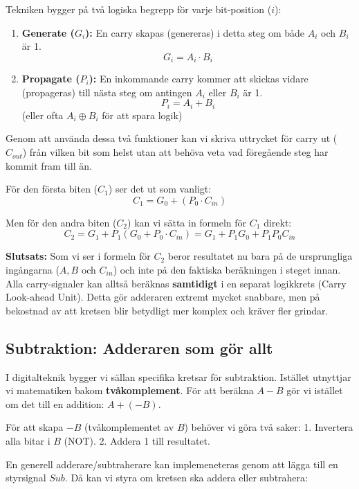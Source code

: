 \documentclass[
  swedish,
  letterpaper,
  oneside,
  openany]{book}
\providecommand{\tightlist}{%
  \setlength{\itemsep}{0pt}\setlength{\parskip}{0pt}}
\begin{document}
Tekniken bygger på två logiska begrepp för varje bit-position (\(i\)):

\begin{enumerate}
\def\labelenumi{\arabic{enumi}.}
\tightlist
\item
  \textbf{Generate (\(G_i\)):} En carry skapas (genereras) i detta steg
  om både \(A_i\) och \(B_i\) är 1. \[G_i = A_i \cdot B_i\]
\item
  \textbf{Propagate (\(P_i\)):} En inkommande carry kommer att skickas
  vidare (propageras) till nästa steg om antingen \(A_i\) eller \(B_i\)
  är 1. \[P_i = A_i + B_i\] (eller ofta \(A_i \oplus B_i\) för att spara
  logik)
\end{enumerate}

Genom att använda dessa två funktioner kan vi skriva uttrycket för carry
ut (\(C_{out}\)) från vilken bit som helst utan att behöva veta vad
föregående steg har kommit fram till än.

För den första biten (\(C_1\)) ser det ut som vanligt:
\[C_1 = G_0 + (P_0 \cdot C_{in})\]

Men för den andra biten (\(C_2\)) kan vi sätta in formeln för \(C_1\)
direkt:
\[C_2 = G_1 + P_1(G_0 + P_0 \cdot C_{in}) = G_1 + P_1 G_0 + P_1 P_0 C_{in}\]

\textbf{Slutsats:} Som vi ser i formeln för \(C_2\) beror resultatet nu
bara på de ursprungliga ingångarna (\(A, B\) och \(C_{in}\)) och inte på
den faktiska beräkningen i steget innan. Alla carry-signaler kan alltså
beräknas \textbf{samtidigt} i en separat logikkrets (Carry Look-ahead
Unit). Detta gör adderaren extremt mycket snabbare, men på bekostnad av
att kretsen blir betydligt mer komplex och kräver fler grindar.

\subsection{Subtraktion: Adderaren som gör
allt}\label{sec-subtraheraren}

I digitalteknik bygger vi sällan specifika kretsar för subtraktion.
Istället utnyttjar vi matematiken bakom \textbf{tvåkomplement}. För att
beräkna \(A - B\) gör vi istället om det till en addition: \(A + (-B)\).

För att skapa \(-B\) (tvåkomplementet av \(B\)) behöver vi göra två
saker: 1. Invertera alla bitar i \(B\) (NOT). 2. Addera 1 till
resultatet.

En generell adderare/subtraherare kan implemeneteras genom att lägga
till en styrsignal \(Sub\). Då kan vi styra om kretsen ska addera eller
subtrahera:
\end{document}
